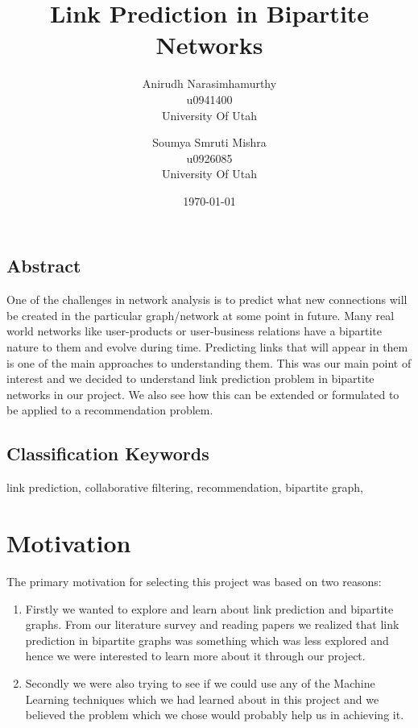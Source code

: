 \documentclass[letterpaper,twocolumn,11pt]{article}
\begin{document}
\date{\today}

\title{\Large \bf  Link Prediction in Bipartite Networks}

\author{
{\rm Anirudh Narasimhamurthy}\\
u0941400\\ 
University Of Utah
\and
{\rm Soumya Smruti Mishra}\\
u0926085\\ 
University Of Utah
} %

\maketitle


\thispagestyle{empty}

\subsection*{Abstract}
One of the challenges in network analysis is to predict what new connections will be created in the particular graph/network at some point in future. Many real world networks like user-products or user-business relations have a bipartite nature to them and evolve during time. Predicting links that will appear in them is one of the main approaches to understanding them. This was our main point of interest and we decided to understand link prediction problem in bipartite networks in our project. We also see how this can be extended or formulated to be applied to a recommendation problem. 


\subsection*{Classification Keywords}
link prediction, collaborative filtering, recommendation, bipartite graph,


\section{Motivation}
The primary motivation for selecting this project was based on two reasons: 
\begin{enumerate}
\item Firstly we wanted to explore and learn about link prediction and bipartite graphs. From our literature survey and reading papers \cite{two} \cite{six} \cite{seven} \cite{eight} we realized that link prediction in bipartite graphs was something which was less explored and hence we were interested to learn more about it through our project. 
\item Secondly we were also trying to see if we could use any of the Machine Learning techniques which we had learned about in this project and we believed the problem which we chose would probably help us in achieving it. 
\end{enumerate}
\end{document}
